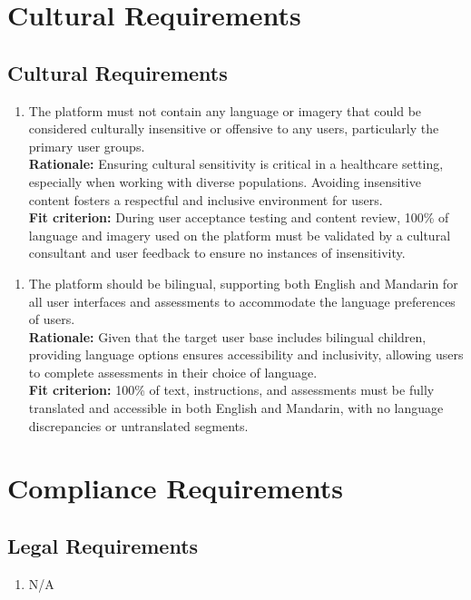 \documentclass[12pt]{article}
\begin{document}
\section{Cultural Requirements}
\subsection{Cultural Requirements}
\begin{enumerate}[{CU-CR}1. ]
  \item The platform must not contain any language or imagery that could be considered culturally insensitive or offensive to any users, particularly the primary user groups.\\
  \textbf{Rationale: }Ensuring cultural sensitivity is critical in a healthcare setting, especially when working with diverse populations. Avoiding insensitive content fosters a respectful and inclusive environment 
  for users.\\
  \textbf{Fit criterion: }During user acceptance testing and content review, 100\% of language and imagery used on the platform must be validated by a cultural consultant and user feedback to ensure no instances of 
  insensitivity.
\end{enumerate}
\begin{enumerate}[{CU-CR}2. ]
  \item The platform should be bilingual, supporting both English and Mandarin for all user interfaces and assessments to accommodate the language preferences of users.\\
  \textbf{Rationale: }Given that the target user base includes bilingual children, providing language options ensures accessibility and inclusivity, allowing users to complete assessments in their choice of language.\\
  \textbf{Fit criterion: }100\% of text, instructions, and assessments must be fully translated and accessible in both English and Mandarin, with no language discrepancies or untranslated segments.  
\end{enumerate}

\section{Compliance Requirements}
\subsection{Legal Requirements}
\begin{enumerate}[{CR-LR}1. ]
  \item N/A
\end{enumerate}
\end{document}
